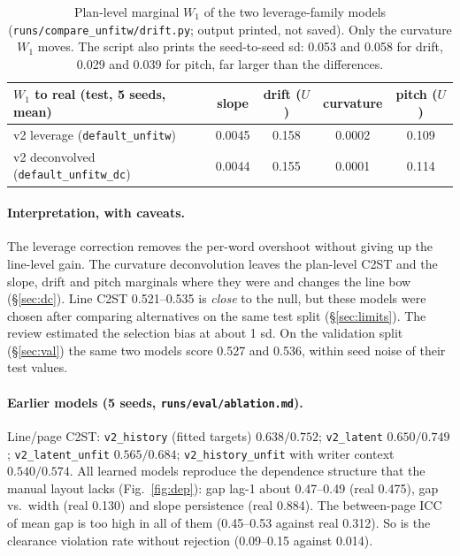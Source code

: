 \documentclass[11pt,a4paper]{article}
\newcommand{\U}{\ensuremath{U}}
\newcommand{\src}[1]{{\footnotesize\texttt{#1}}}
\begin{document}
\begin{table}[H]\centering\small
\begin{tabular}{lcccc}
\toprule
$W_1$ to real (test, 5 seeds, mean) & slope & drift (\U) & curvature & pitch (\U)\\
\midrule
v2 leverage (\texttt{default\_unfitw}) & 0.0045 & 0.158 & 0.0002 & 0.109\\
v2 deconvolved (\texttt{default\_unfitw\_dc}) & 0.0044 & 0.155 & 0.0001 & 0.114\\
\bottomrule
\end{tabular}
\caption{Plan-level marginal $W_1$ of the two leverage-family models
(\src{runs/compare\_unfitw/drift.py}; output printed, not saved). Only the
curvature $W_1$ moves. The script also prints the seed-to-seed sd: 0.053 and
0.058 for drift, 0.029 and 0.039 for pitch, far larger than the
differences.}
\label{tab:drift}
\end{table}

\paragraph{Interpretation, with caveats.} The leverage correction removes the
per-word overshoot without giving up the line-level gain. The curvature
deconvolution leaves the plan-level C2ST and the slope, drift and pitch
marginals where they were and changes the line bow (\S\ref{sec:dc}). Line
C2ST 0.521--0.535 is \emph{close} to the null, but these models were chosen
after comparing alternatives on the same test split (\S\ref{sec:limits}). The
review estimated the selection bias at about 1 sd. On the validation split
(\S\ref{sec:val}) the same two models score 0.527 and 0.536, within seed noise
of their test values.

\paragraph{Earlier models (5 seeds, \src{runs/eval/ablation.md}).} Line/page
C2ST: \texttt{v2\_history} (fitted targets) $0.638/0.752$;
\texttt{v2\_latent} $0.650/0.749$; \texttt{v2\_latent\_unfit} $0.565/0.684$;
\texttt{v2\_history\_unfit} with writer context $0.540/0.574$. All learned
models reproduce the dependence structure that the manual layout lacks
(Fig.~\ref{fig:dep}): gap lag-1 about 0.47--0.49 (real 0.475), gap vs.\ width
(real 0.130) and slope persistence (real 0.884). The between-page ICC of
mean gap is too high in all of them (0.45--0.53 against real 0.312). So is the
clearance violation rate without rejection (0.09--0.15 against 0.014).
\end{document}
